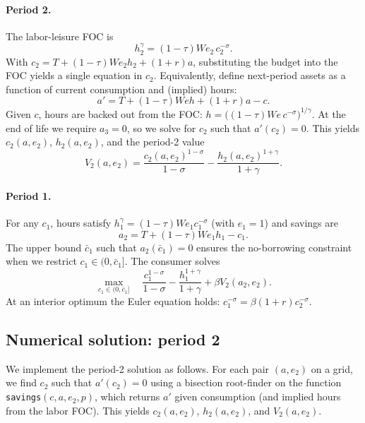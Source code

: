 \paragraph{Period 2.}
The labor-leisure FOC is
\begin{equation}
  h_2^\gamma = (1-\tau) W e_2\, c_2^{-\sigma}.
\end{equation}
With $c_2 = T + (1-\tau) W e_2 h_2 + (1+r) a$, substituting the budget into the FOC yields a single equation in $c_2$. Equivalently, define next-period assets as a function of current consumption and (implied) hours:
\begin{equation}
  a' = T + (1-\tau) W e h + (1+r) a - c.
\end{equation}
Given $c$, hours are backed out from the FOC: $h = \bigl( (1-\tau) W e\, c^{-\sigma} \bigr)^{1/\gamma}$. At the end of life we require $a_3 = 0$, so we solve for $c_2$ such that $a'(c_2) = 0$. This yields $c_2(a,e_2)$, $h_2(a,e_2)$, and the period-2 value
\begin{equation}
  V_2(a,e_2) = \frac{c_2(a,e_2)^{1-\sigma}}{1-\sigma} - \frac{h_2(a,e_2)^{1+\gamma}}{1+\gamma}.
\end{equation}

\paragraph{Period 1.}
For any $c_1$, hours satisfy $h_1^\gamma = (1-\tau) W e_1 c_1^{-\sigma}$ (with $e_1=1$) and savings are
\begin{equation}
  a_2 = T + (1-\tau) W e_1 h_1 - c_1.
\end{equation}
The upper bound $\bar{c}_1$ such that $a_2(\bar{c}_1) = 0$ ensures the no-borrowing constraint when we restrict $c_1 \in (0, \bar{c}_1]$. The consumer solves
\begin{equation}
  \max_{c_1 \in (0,\bar{c}_1]} \quad \frac{c_1^{1-\sigma}}{1-\sigma} - \frac{h_1^{1+\gamma}}{1+\gamma} + \beta V_2(a_2, e_2).
\end{equation}
At an interior optimum the Euler equation holds: $c_1^{-\sigma} = \beta(1+r) c_2^{-\sigma}$.

\subsection{Numerical solution: period 2}

We implement the period-2 solution as follows. For each pair $(a, e_2)$ on a grid, we find $c_2$ such that $a'(c_2) = 0$ using a bisection root-finder on the function \texttt{savings}$(c, a, e_2, p)$, which returns $a'$ given consumption (and implied hours from the labor FOC). This yields $c_2(a,e_2)$, $h_2(a,e_2)$, and $V_2(a,e_2)$.

